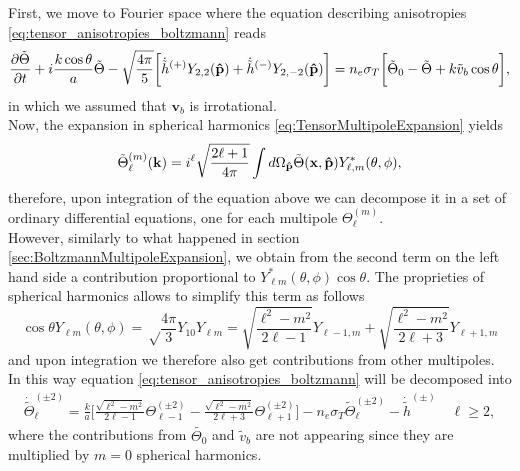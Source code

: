 First, we move to Fourier space where the equation describing anisotropies \eqref{eq:tensor_anisotropies_boltzmann} reads
$$\frac{\partial\tilde \Theta}{\partial t}+i\frac{k\cos\theta}{a} \tilde\Theta-\sqrt{\frac{4\pi}{5}}\bigg[\dot{\tilde{h}}^{(+)}Y_{2,2}(\mathbf{\hat{p}})+\dot{\tilde{h}}^{(-)}Y_{2,-2}(\mathbf{\hat{p}})\bigg]=n_{e}\sigma_T\bigg[\tilde\Theta_0-\tilde\Theta+k\tilde v_{b}\cos\theta\bigg],$$ in which we assumed that $\mathbf{v}_b$ is irrotational. \\Now, the expansion in spherical harmonics \eqref{eq:TensorMultipoleExpansion} yields 
$$\tilde{\Theta}_{\ell}^{(m)}(\mathbf{k})=i^\ell\sqrt{\frac{2\ell+1}{4\pi}}\int d\Omega_{\mathbf{\hat{p}}}\tilde\Theta(\mathbf{x},\mathbf{\hat{p}})Y_{\ell,m}^*(\theta,\phi),$$
therefore, upon integration of the equation above we can decompose it in a set of ordinary differential equations, one for each multipole $\Theta_\ell^{(m)}$.\\
However, similarly to what happened in section \ref{sec:BoltzmannMultipoleExpansion}, we obtain from the second term on the left hand side a contribution proportional to $Y^*_{\ell m}(\theta,\phi)\cos\theta$. The proprieties of spherical harmonics allows to simplify this term as follows
$$
\cos\theta Y_{\ell m}(\theta,\phi)=\sqrt\frac{4\pi}{3}Y_{10}Y_{\ell m}=\sqrt{\frac{\ell^2-m^2}{2\ell-1}}Y_{\ell-1,m}+\sqrt{\frac{\ell^2-m^2}{2\ell+3}}Y_{\ell+1,m}
$$  and upon integration we therefore also get contributions from other multipoles.\\In this way equation \eqref{eq:tensor_anisotropies_boltzmann}
will be decomposed into
\begin{align}
    \dot{\tilde\Theta}_\ell^{(\pm2)}=\frac{k}{a}\bigg[\frac{\sqrt{\ell^2-m^2}}{2\ell-1}\Theta_{\ell-1}^{(\pm2)}-\frac{\sqrt{\ell^2-m^2}}{2\ell+3}\Theta_{\ell+1}^{(\pm2)}\bigg]-n_e\sigma_T\tilde\Theta_{\ell}^{(\pm2)}-\dot{\tilde h}^{(\pm)}\quad \ell\geq2,
\end{align}
where the contributions from $\tilde{\Theta_0}$ and $\tilde v_b$ are not appearing since they are multiplied by $m=0$ spherical harmonics.

